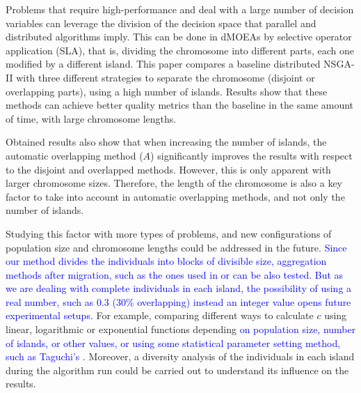 \documentclass[preprint]{elsarticle}
\begin{document}
Problems that require high-performance 
 and deal with a large number of decision variables can leverage the
 division of the decision space that parallel and distributed
 algorithms imply. This can be done in dMOEAs by selective operator application (SLA), that is, dividing the
 chromosome into different parts, each one modified by a different
 island. This paper compares a baseline distributed NSGA-II with three
 different strategies to separate the chromosome (disjoint or
 overlapping parts), using a high number of islands. Results show that
 these methods can achieve better quality metrics than the baseline in
 the same amount of time, with large chromosome lengths. 

Obtained results also show that when increasing the number of islands, the
automatic overlapping method ($A$) %
significantly improves the results with
respect to the disjoint and overlapped methods. %
However, this is only
apparent with larger chromosome sizes. Therefore, the length of the
chromosome is also a key factor to take into account in automatic overlapping
methods, and not only the number of islands. %



Studying this factor with
more types of problems, and new configurations of population size and
chromosome lengths could be addressed in the future. \textcolor{blue}{Since our method divides the individuals into blocks of divisible size, aggregation methods after migration, such as the ones used in \cite{Kimovski15Parallel} or \cite{Dorronsoro13superlinear} can be also tested. But as we are dealing with complete individuals in each island, the possibility of using a real number, such as 0.3 (30\% overlapping) instead an integer value opens future experimental setups.}
For example, comparing 
different ways to calculate $c$ using linear, logarithmic or exponential functions
depending \textcolor{blue}{on population size, number of islands, or other values, or using some statistical parameter setting method, such as Taguchi's \cite{Keratmatpour2018Taguchi}}. Moreover, a diversity analysis of the individuals
in each island during the algorithm run could be carried out to understand its influence
on the results.
% 
\end{document}

